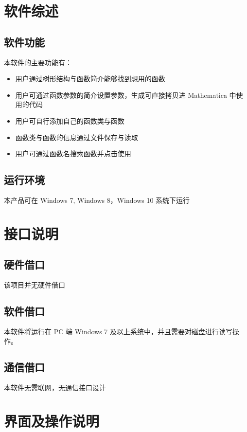 \documentclass[hyperref, UTF8
,bookmarksnumbered=true, oneside]{ctexbook}
\begin{document}


	



\chapter{软件综述}

	\section{软件功能} %
	本软件的主要功能有：
	\label{sec:}
		\begin{itemize}
			\item 用户通过树形结构与函数简介能够找到想用的函数
			\item 用户可通过函数参数的简介设置参数，生成可直接拷贝进 Mathematica 中使
用的代码
			\item 用户可自行添加自己的函数类与函数
			\item 函数类与函数的信息通过文件保存与读取
			\item 用户可通过函数名搜索函数并点击使用
		\end{itemize}
	
	\section{运行环境} %
		

		本产品可在 Windows 7, Windows 8，Windows 10 系统下运行

\chapter{接口说明}

	\section{硬件借口}
		该项目并无硬件借口
	\section{软件借口}
		本软件将运行在 PC 端 Windows 7 及以上系统中，并且需要对磁盘进行读写操作。
	\section{通信借口}
		本软件无需联网，无通信接口设计

\chapter{界面及操作说明}
\end{document}
